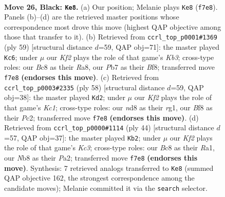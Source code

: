 \documentclass[11pt]{article}
\begin{document}
\clearpage

\begin{figure}[p]\centering
\begin{subfigure}{0.46\textwidth}\centering
\resizebox{\linewidth}{!}{%
\newchessgame
\chessboard[
  setfen={rnbN1b2/ppp1pk2/5n2/P1P5/8/6R1/1P3P2/RNB1K3 b Q - 0 26},
  showmover=false,
  pgfstyle=straightmove, color=movearrow, markmove={f7-e8}
]}
\caption{}
\end{subfigure}\hfill
\begin{subfigure}{0.46\textwidth}\centering
\resizebox{\linewidth}{!}{%
\newchessgame
\chessboard[
  setfen={r4b2/pb1N2R1/1k2p3/1p1nP1P1/2pR4/8/PP3P2/2K5 b - - 4 30},
  showmover=false,
  pgfstyle=straightmove, color=movearrow, markmove={b6-c6}
]}
\caption{}
\end{subfigure}
\\[4pt]
\begin{subfigure}{0.46\textwidth}\centering
\resizebox{\linewidth}{!}{%
\newchessgame
\chessboard[
  setfen={3r3k/5p1n/4p2B/1p2P3/3pN3/P7/1PP2P1R/2K3r1 w - - 2 30},
  showmover=false,
  pgfstyle=straightmove, color=movearrow, markmove={c1-d2}
]}
\caption{}
\end{subfigure}\hfill
\begin{subfigure}{0.46\textwidth}\centering
\resizebox{\linewidth}{!}{%
\newchessgame
\chessboard[
  setfen={2rr4/pp1b2k1/5p2/n2Pp3/4P1p1/2KB4/P2N1PPR/R7 w - - 2 23},
  showmover=false,
  pgfstyle=straightmove, color=movearrow, markmove={c3-b2}
]}
\caption{}
\end{subfigure}
\caption{\textbf{Move 26, Black: \texttt{Ke8}.} (a) Our position; Melanie plays \texttt{Ke8} (\texttt{f7e8}). Panels (b)--(d) are the retrieved master positions whose correspondence most drove this move (highest QAP objective among those that transfer to it). (b) Retrieved from \texttt{ccrl\_top\_p0001\#1369} (ply 59) [structural distance $d$=59, QAP obj=71]: the master played \texttt{Kc6}; under $\mu$ our \emph{Kf2} plays the role of that game's \emph{Kb3}; cross-type roles: our \emph{B}c8 as their \emph{R}a8, our \emph{P}b7 as their \emph{B}f8; transferred move \texttt{f7e8} \textbf{(endorses this move)}. (c) Retrieved from \texttt{ccrl\_top\_p0003\#2335} (ply 58) [structural distance $d$=59, QAP obj=38]: the master played \texttt{Kd2}; under $\mu$ our \emph{Kf2} plays the role of that game's \emph{Kc1}; cross-type roles: our \emph{n}d8 as their \emph{r}g1, our \emph{B}f8 as their \emph{P}c2; transferred move \texttt{f7e8} \textbf{(endorses this move)}. (d) Retrieved from \texttt{ccrl\_top\_p0000\#1114} (ply 44) [structural distance $d$=57, QAP obj=37]: the master played \texttt{Kb2}; under $\mu$ our \emph{Kf2} plays the role of that game's \emph{Kc3}; cross-type roles: our \emph{B}c8 as their \emph{R}a1, our \emph{N}b8 as their \emph{P}a2; transferred move \texttt{f7e8} \textbf{(endorses this move)}. Synthesis: 7 retrieved analogs transferred to \texttt{Ke8} (summed QAP objective 162, the strongest correspondence among the candidate moves); Melanie committed it via the \texttt{search} selector.}
\label{fig:thought-m51}
\end{figure}
\end{document}
